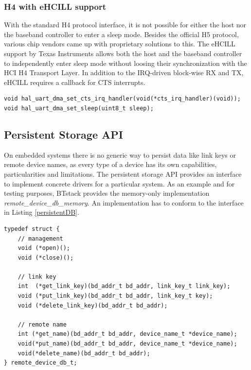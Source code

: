 \documentclass[a4paper,titlepage,oneside,12pt]{amsart} %
\begin{document}
\subsubsection{H4 with eHCILL support}
With the standard H4 protocol interface, it is not possible for either the host nor the baseband controller to enter a sleep mode. Besides the official H5 protocol, various chip vendors came up with proprietary solutions to this. The eHCILL support by Texas Instruments allows both the host and the baseband controller to independently enter sleep mode without loosing their synchronization with the HCI H4 Transport Layer. In addition to the IRQ-driven block-wise RX and TX, eHCILL requires a callback for CTS interrupts.

\begin{lstlisting}
void hal_uart_dma_set_cts_irq_handler(void(*cts_irq_handler)(void));
void hal_uart_dma_set_sleep(uint8_t sleep);
\end{lstlisting}


\subsection{Persistent Storage API}
\label{section:persistent_storage}

On embedded systems there is no generic way to persist data like link keys or remote device names, as every type of a device has its own capabilities, particularities and limitations. The persistent storage API provides an interface to implement concrete drivers for a particular system. As an example and for testing purposes, BTstack provides the memory-only implementation \emph{remote\_device\_db\_memory}. An implementation has to conform to the interface in Listing \ref{persistentDB}.
\\

\begin{lstlisting}[float, caption=Persistent Storage Interface., label=persistentDB]
typedef struct {
    // management
    void (*open)();
    void (*close)();
    
    // link key
    int  (*get_link_key)(bd_addr_t bd_addr, link_key_t link_key);
    void (*put_link_key)(bd_addr_t bd_addr, link_key_t key);
    void (*delete_link_key)(bd_addr_t bd_addr);
    
    // remote name
    int (*get_name)(bd_addr_t bd_addr, device_name_t *device_name);
    void(*put_name)(bd_addr_t bd_addr, device_name_t *device_name);
    void(*delete_name)(bd_addr_t bd_addr);
} remote_device_db_t;

\end{lstlisting}
\end{document}
